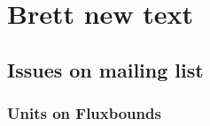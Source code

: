 
\section{ Brett new text }
\subsection{ Issues on mailing list }
\subsubsection{ Units on Fluxbounds }